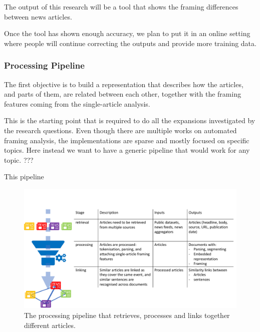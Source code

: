 The output of this research will be a tool that shows the framing differences between news articles.

Once the tool has shown enough accuracy, we plan to put it in an online setting where people will continue correcting the outputs and provide more training data.

\subsubsection{Processing Pipeline}
\label{sec:prop_pipeline}
The first objective is to build a representation that describes how the articles, and parts of them, are related between each other, together with the framing features coming from the single-article analysis.

This is the starting point that is required to do all the expansions investigated by the research questions.
Even though there are multiple works on automated framing analysis, the implementations are sparse and mostly focused on specific topics.
Here instead we want to have a generic pipeline that would work for any topic.
???

This pipeline

\begin{figure}[!htb]
    \centering
    \includegraphics[width=\textwidth]{figures/figure_pipeline.pdf}
    \caption{The processing pipeline that retrieves, processes and links together different articles.}
    \label{fig:pipeline}
\end{figure}

